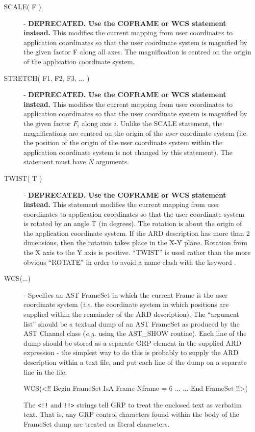 \documentclass[11pt,nolof]{starlink}
\begin{document}
\begin{description}
\item [\label{ST:SCA}SCALE( F )] - \textbf{DEPRECATED. Use the COFRAME or WCS statement instead.} This modifies the current mapping from user coordinates to
application coordinates so that the user coordinate system is magnified by the
given factor F along all axes. The magnification is centred on the origin of the
application coordinate system.

\item [\label{ST:STR}STRETCH( F1, F2, F3, ... )] - \textbf{DEPRECATED. Use the COFRAME or WCS statement instead.} This modifies the current mapping from user
coordinates to application coordinates so that the user coordinate system is
magnified by the given factor $F_{i}$ along axis $i$. Unlike the SCALE
statement, the magnifications are centred on the origin of the \emph{user}
coordinate system (i.e. the position of the origin of the user coordinate
system within the application coordinate system is not changed by this
statement). The statement must have $N$ arguments.

\item [\label{ST:TWI}TWIST( T )] - \textbf{DEPRECATED. Use the COFRAME or WCS statement instead.} This statement modifies the current mapping from user
coordinates to application coordinates so that the user coordinate system is
rotated by an angle T (in degrees). The rotation is about the origin of the
application coordinate system. If the ARD description has more than 2
dimensions, then the rotation takes place in the X-Y plane. Rotation from the X
axis to the Y axis is positive. ``TWIST'' is used rather than the more obvious
``ROTATE'' in order to avoid a name clash with the keyword
.

\item [\label{ST:WCS}WCS(...)] - Specifies an AST FrameSet in which the
current Frame is the user coordinate system (\emph{i.e.} the coordinate
system in which positions are supplied within the remainder of the ARD
description). The ``argument list'' should be a textual dump of an AST
FrameSet as produced by the AST Channel class (\emph{e.g.} using the
AST\_SHOW routine). Each line of the dump should be stored as a separate
GRP element in the supplied ARD expression - the simplest way to do this
is probably to supply the ARD description within a text file, and put
each line of the dump on a separate line in the file:

\small
\begin{terminalv}
   WCS(<!!
       Begin FrameSet
       IsA Frame
       Nframe = 6
       ...
       ...
       End FrameSet
   !!>)
\end{terminalv}
\normalsize

The \verb+<!!+ and \verb+!!>+ strings tell GRP to treat the enclosed text as
verbatim text. That is, any GRP control characters found within the
body of the FrameSet dump are treated as literal characters.

\end{description}
\end{document}
